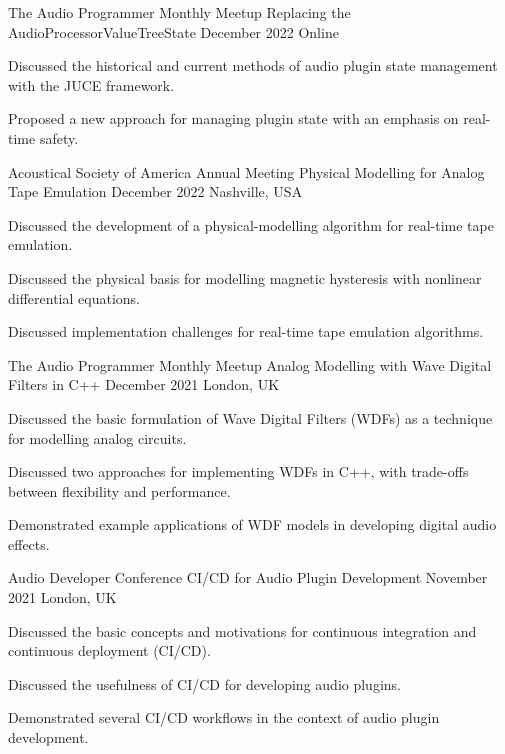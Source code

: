 \begin{cventries}
  \cventry
    {The Audio Programmer Monthly Meetup} %
    {Replacing the AudioProcessorValueTreeState} %
    {December 2022} %
    {Online} %
    {
      \begin{cvitems} %
        \item {Discussed the historical and current methods of audio plugin state management with the JUCE framework.}
        \item {Proposed a new approach for managing plugin state with an emphasis on real-time safety.}
      \end{cvitems}
    }


  \cventry
    {Acoustical Society of America Annual Meeting} %
    {Physical Modelling for Analog Tape Emulation} %
    {December 2022} %
    {Nashville, USA} %
    {
      \begin{cvitems} %
        \item {Discussed the development of a physical-modelling algorithm for real-time tape emulation.}
        \item {Discussed the physical basis for modelling magnetic hysteresis with nonlinear differential equations.}
        \item {Discussed implementation challenges for real-time tape emulation algorithms.}
      \end{cvitems}
    }

  \cventry
    {The Audio Programmer Monthly Meetup} %
    {Analog Modelling with Wave Digital Filters in C++} %
    {December 2021} %
    {London, UK} %
    {
      \begin{cvitems} %
        \item {Discussed the basic formulation of Wave Digital Filters (WDFs) as a technique for modelling analog circuits.}
        \item {Discussed two approaches for implementing WDFs in C++, with trade-offs between flexibility and performance.}
        \item {Demonstrated example applications of WDF models in developing digital audio effects.}
      \end{cvitems}
    }

  \cventry
    {Audio Developer Conference} %
    {CI/CD for Audio Plugin Development} %
    {November 2021} %
    {London, UK} %
    {
      \begin{cvitems} %
        \item {Discussed the basic concepts and motivations for continuous integration and continuous deployment (CI/CD).}
        \item {Discussed the usefulness of CI/CD for developing audio plugins.}
        \item {Demonstrated several CI/CD workflows in the context of audio plugin development.}
      \end{cvitems}
    }


\end{cventries}
